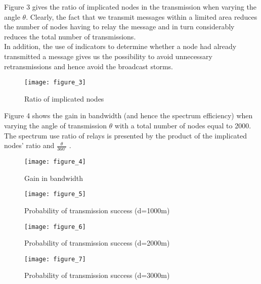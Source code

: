 \documentclass{IEEEtran}
\begin{document}
Figure 3 gives the ratio of implicated nodes in the transmission
when varying the angle $\theta$. Clearly, the fact that we transmit
messages within a limited area reduces the number of nodes having to
relay the message and in turn
considerably reduces the total number of transmissions.\\
In addition, the use of indicators to determine whether a node had
already transmitted a message gives us the possibility to avoid
unnecessary retransmissions and hence avoid the broadcast storms.

\begin{figure}[!htbp]
  \begin{center}
\texttt{[image: figure\_3]}
  \end{center}
  \caption{Ratio of implicated nodes}
\end{figure}
Figure 4 shows the gain in bandwidth (and hence the spectrum
efficiency) when varying the angle of transmission $\theta$ with a
total number of nodes equal to 2000. The spectrum use ratio of
relays is presented by the product of the implicated nodes' ratio
and
    $\frac{\theta}{360^{\circ}}$
.

\begin{figure}[!htbp]
  \begin{center}
\texttt{[image: figure\_4]}
  \end{center}
  \caption{Gain in bandwidth}
\end{figure}

\begin{figure}[!htbp]
  \begin{center}
\texttt{[image: figure\_5]}
  \end{center}
  \caption{Probability of transmission success (d=1000m)}
\end{figure}


\begin{figure}[!htbp]
  \begin{center}
\texttt{[image: figure\_6]}
  \end{center}
  \caption{Probability of transmission success (d=2000m)}
\end{figure}


\begin{figure}[!htbp]
  \begin{center}
\texttt{[image: figure\_7]}
  \end{center}
  \caption{Probability of transmission success (d=3000m)}
\end{figure}
\end{document}
